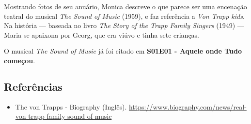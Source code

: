 Mostrando fotos de seu anuário, Monica descreve o que parece ser uma
encenação teatral do musical \emph{The Sound of Music} (1959), e faz
referência a \emph{Von Trapp kids}. Na história --- baseada no livro
\emph{The Story of the Trapp Family Singers} (1949) --- Maria se
apaixona por Georg, que era viúvo e tinha sete crianças.

O musical \emph{The Sound of Music} já foi citado em
\textbf{\textcolor{primarycolor}{S01E01 - Aquele onde Tudo começou}}.

\hypertarget{referuxeancias-4}{%
\subsection{Referências}\label{referuxeancias-4}}

\begin{itemize}
\tightlist
\item
  \sloppy The von Trapps - Biography (Inglês). \url{https://www.biography.com/news/real-von-trapp-family-sound-of-music}
\end{itemize}
